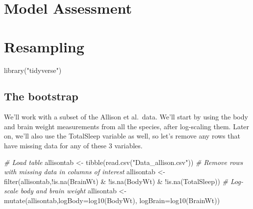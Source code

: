 \documentclass[
]{book}
\newenvironment{Shaded}{\begin{snugshade}}{\end{snugshade}}
\newcommand{\AttributeTok}[1]{\textcolor[rgb]{0.77,0.63,0.00}{#1}}
\newcommand{\CommentTok}[1]{\textcolor[rgb]{0.56,0.35,0.01}{\textit{#1}}}
\newcommand{\FunctionTok}[1]{\textcolor[rgb]{0.00,0.00,0.00}{#1}}
\newcommand{\NormalTok}[1]{#1}
\newcommand{\OtherTok}[1]{\textcolor[rgb]{0.56,0.35,0.01}{#1}}
\newcommand{\SpecialCharTok}[1]{\textcolor[rgb]{0.00,0.00,0.00}{#1}}
\newcommand{\StringTok}[1]{\textcolor[rgb]{0.31,0.60,0.02}{#1}}
\begin{document}
\hypertarget{model-assessment}{%
\chapter{Model Assessment}\label{model-assessment}}

\hypertarget{resampling}{%
\chapter{Resampling}\label{resampling}}

\begin{Shaded}
\begin{Highlighting}[]
\FunctionTok{library}\NormalTok{(}\StringTok{"tidyverse"}\NormalTok{)}
\end{Highlighting}
\end{Shaded}

\hypertarget{the-bootstrap}{%
\section{The bootstrap}\label{the-bootstrap}}

We'll work with a subset of the Allison et al.~data. We'll start by using the body and brain weight measurements from all the species, after log-scaling them. Later on, we'll also use the TotalSleep variable as well, so let's remove any rows that have missing data for any of these 3 variables.

\begin{Shaded}
\begin{Highlighting}[]
\CommentTok{\# Load table}
\NormalTok{allisontab }\OtherTok{\textless{}{-}} \FunctionTok{tibble}\NormalTok{(}\FunctionTok{read.csv}\NormalTok{(}\StringTok{"Data\_allison.csv"}\NormalTok{))}
\CommentTok{\# Remove rows with missing data in columns of interest }
\NormalTok{allisontab }\OtherTok{\textless{}{-}} \FunctionTok{filter}\NormalTok{(allisontab,}\SpecialCharTok{!}\FunctionTok{is.na}\NormalTok{(BrainWt) }\SpecialCharTok{\&} \SpecialCharTok{!}\FunctionTok{is.na}\NormalTok{(BodyWt) }\SpecialCharTok{\&} \SpecialCharTok{!}\FunctionTok{is.na}\NormalTok{(TotalSleep))}
\CommentTok{\# Log{-}scale body and brain weight}
\NormalTok{allisontab }\OtherTok{\textless{}{-}} \FunctionTok{mutate}\NormalTok{(allisontab,}\AttributeTok{logBody=}\FunctionTok{log10}\NormalTok{(BodyWt), }\AttributeTok{logBrain=}\FunctionTok{log10}\NormalTok{(BrainWt))}
\end{Highlighting}
\end{Shaded}
\end{document}
